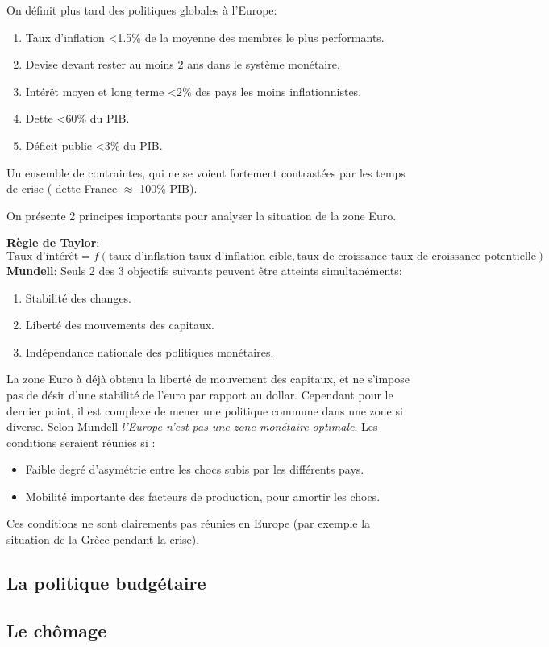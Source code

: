 On définit plus tard des politiques globales à l'Europe: 
\begin{enumerate}
	\item Taux d'inflation <1.5$\%$ de la moyenne des membres le plus performants.
	\item Devise devant rester au moins 2 ans dans le système monétaire.
	\item Intérêt moyen et long terme <$2\%$ des pays les moins inflationnistes.
	\item Dette <$60\%$ du PIB.
	\item Déficit public <$3\%$ du PIB.
	
\end{enumerate}

Un ensemble de contraintes, qui ne se voient fortement contrastées par les temps de crise ( dette France $\approx$ 100$\%$ PIB).

On présente 2 principes importants pour analyser la situation de la zone Euro. 

\textbf{Règle de Taylor}: 	\[
	\text{Taux d'intérêt}= f(\text{taux d'inflation-taux d'inflation cible},\text{taux de croissance-taux de croissance potentielle})
\]
\textbf{Mundell}: Seuls 2 des 3 objectifs suivants peuvent être atteints simultanéments: 
\begin{enumerate}
	\item Stabilité des changes.
	\item Liberté des mouvements des capitaux.
	\item Indépendance nationale des politiques monétaires. 
\end{enumerate}

La zone Euro à déjà obtenu la liberté de mouvement des capitaux, et ne s'impose pas de désir d'une stabilité de l'euro par rapport au dollar. Cependant pour le
dernier point, il est complexe de mener une politique commune dans une zone si diverse. Selon Mundell \emph{l'Europe n'est pas une zone monétaire optimale}.
Les conditions seraient réunies si : 
\begin{itemize}
	\item Faible degré d'asymétrie entre les chocs subis par les différents pays.
	\item Mobilité importante des facteurs de production, pour amortir les chocs. 
\end{itemize}
Ces conditions ne sont clairements pas réunies en Europe (par exemple la situation de la Grèce pendant la crise).
\subsection{La politique budgétaire} %
\label{sub:la_politique_budgetaire}

\begin{tcolorbox}[title= Modèle IS-LM]
	
\end{tcolorbox}


\subsection{Le chômage} %
\label{sub:le_chomage}


